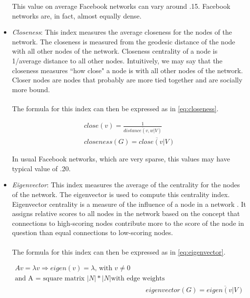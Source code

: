 \begin{itemize}
This value on average Facebook networks can vary around .15.
Facebook networks are, in fact, almost equally dense.

\item \emph{Closeness}: This index measures the average closeness for the nodes of the network.
The closeness is measured from the geodesic distance of the node with all other nodes of the network.
Closeness centrality of a node is 1/average distance to all other nodes.
Intuitively, we may say that the closeness measures ``how close" a node is with all other nodes of the network.
Closer nodes are nodes that probably are more tied together and are socially more bound.\\
\\
The formula for this index can then be expressed as in \ref{eq:closeness}.

\begin{equation}
\begin{split}
close(v) = \frac{1}{\overline{distance(v, w | V)}} \\
closeness(G) = \overline{close(v | V)}
\end{split}
\label{eq:closeness}
\end{equation}

In usual Facebook networks, which are very sparse, this values may have typical value of .20.

\item \emph{Eigenvector}: This index measures the average of the centrality for the nodes of the network.
The eigenvector is used to compute this centrality index.
Eigenvector centrality is a measure of the inﬂuence of a node in a network \cite{Axler-1997}.
It assigns relative scores to all nodes in the network based on the concept that connections to high-scoring nodes contribute more to the score of the node in question
than equal connections to low-scoring nodes.\\
\\
The formula for this index can then be expressed as in \ref{eq:eigenvector}.

\begin{equation}
\begin{split}
Av = \lambda v \Rightarrow eigen(v) = \lambda \textrm{, with } v \neq 0 \\
\textrm{and A = square matrix } \left | N \right |*\left | N \right |
\textrm{with edge weights} \\
\quad & eigenvector(G) = \overline{eigen(v | V)}
\end{split}
\label{eq:eigenvector}
\end{equation}


\end{itemize}
